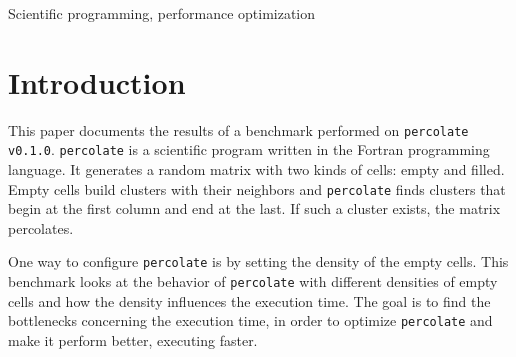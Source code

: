 \documentclass[twoside,11pt]{article}
\title{\titl}
\author{}
\def\perc{\texttt{perco\-late}}
\def\v{\texttt{v0.1.0}}
\begin{document}
\maketitle

\begin{abstract}
  \perc{} \v{} is a scientific program.
  It generates a random matrix with two kinds of cells:
  empty and filled.
  Empty cells build clusters with their neighbors and
  \perc{} finds clusters that begin at the first column and
  end at the last.
  If such a cluster exists, the matrix percolates.

  The benchmark of \perc{} looks at how the program
  scales with different densities of filled cells.
  The goal of this benchmark is to find bottlenecks of
  the execution time, in order to optimize \perc{} in
  coming releases.

  The benchmark was executed on the Cirrus supercomputer
  with exclusive access to one back end node.
  The results of the benchmark show extreme scaling
  behavior of \perc{}, but successfully exposes the
  bottleneck.

  This paper discusses the results of the benchmark and
  gives an outline for optimizing \perc{} in future
  releases.
\end{abstract}

\begin{keywords}
Scientific programming, performance optimization
\end{keywords}

\section{Introduction} %

This paper documents the results of a benchmark performed
on \perc{} \v{}.
\perc{} is a scientific program written in the
Fortran programming language. It generates a random matrix
with two kinds of cells: empty and filled.
Empty cells build clusters with their neighbors and
\perc{} finds clusters that begin at the first column and
end at the last.
If such a cluster exists, the matrix percolates.

One way to configure \perc{} is by setting the density of
the empty cells.
This benchmark looks at the behavior of \perc{} with
different densities of empty cells and how the density
influences the execution time.
The goal is to find the bottlenecks concerning the
execution time, in order to optimize \perc{} and make it
perform better, executing faster.
\end{document}
